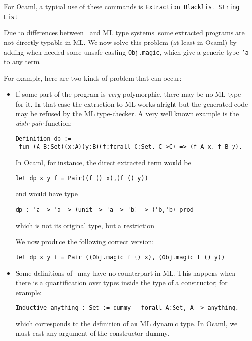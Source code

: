 For Ocaml, a typical use of these commands is
{\tt Extraction Blacklist String List}.



Due to differences between \Coq\ and ML type systems, 
some extracted programs are not directly typable in ML. 
We now solve this problem (at least in Ocaml) by adding 
when needed some unsafe casting {\tt Obj.magic}, which give
a generic type {\tt 'a} to any term.

For example, here are two kinds of problem that can occur:

\begin{itemize}
  \item If some part of the program is {\em very} polymorphic, there
    may be no ML type for it. In that case the extraction to ML works
    alright but the generated code may be refused by the ML
    type-checker. A very well known example is the {\em distr-pair}
    function:
\begin{verbatim}
Definition dp := 
 fun (A B:Set)(x:A)(y:B)(f:forall C:Set, C->C) => (f A x, f B y).
\end{verbatim}

In Ocaml, for instance, the direct extracted term would be
\begin{verbatim}
let dp x y f = Pair((f () x),(f () y))
\end{verbatim}

and would have type
\begin{verbatim}
dp : 'a -> 'a -> (unit -> 'a -> 'b) -> ('b,'b) prod
\end{verbatim}

which is not its original type, but a restriction.

We now produce the following correct version:
\begin{verbatim}
let dp x y f = Pair ((Obj.magic f () x), (Obj.magic f () y))
\end{verbatim}

  \item Some definitions of \Coq\ may have no counterpart in ML. This
    happens when there is a quantification over types inside the type
    of a constructor; for example:
\begin{verbatim}
Inductive anything : Set := dummy : forall A:Set, A -> anything.
\end{verbatim}

which corresponds to the definition of an ML dynamic type.
In Ocaml, we must cast any argument of the constructor dummy.

\end{itemize}

